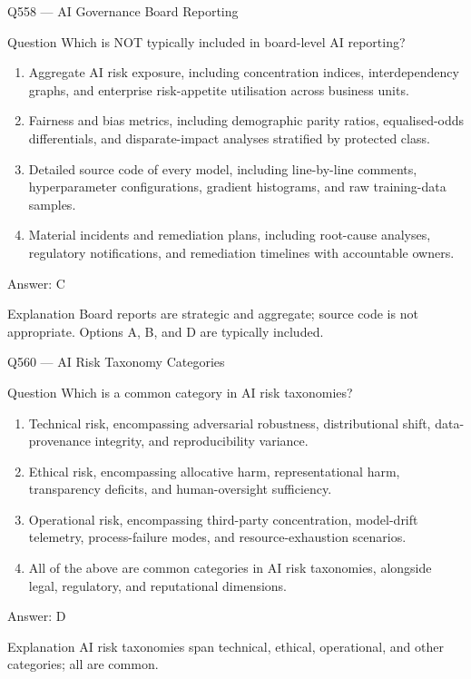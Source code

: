\documentclass[aspectratio=169,8pt]{beamer}
\begin{document}
	\begin{frame}{Q558 --- AI Governance Board Reporting}
		\begin{block}{Question}
			Which is NOT typically included in board-level AI reporting?
			\begin{enumerate}
				\item Aggregate AI risk exposure, including concentration indices, interdependency graphs, and enterprise risk-appetite utilisation across business units.
				\item Fairness and bias metrics, including demographic parity ratios, equalised-odds differentials, and disparate-impact analyses stratified by protected class.
				\item Detailed source code of every model, including line-by-line comments, hyperparameter configurations, gradient histograms, and raw training-data samples.
				\item Material incidents and remediation plans, including root-cause analyses, regulatory notifications, and remediation timelines with accountable owners.
			\end{enumerate}
		\end{block}
		\begin{exampleblock}{Answer: C}\end{exampleblock}
		\begin{block}{Explanation}
			Board reports are strategic and aggregate; source code is not appropriate. Options A, B, and D are typically included.
		\end{block}
	\end{frame}
	
	
	\begin{frame}{Q560 --- AI Risk Taxonomy Categories}
		\begin{block}{Question}
			Which is a common category in AI risk taxonomies?
			\begin{enumerate}
				\item Technical risk, encompassing adversarial robustness, distributional shift, data-provenance integrity, and reproducibility variance.
				\item Ethical risk, encompassing allocative harm, representational harm, transparency deficits, and human-oversight sufficiency.
				\item Operational risk, encompassing third-party concentration, model-drift telemetry, process-failure modes, and resource-exhaustion scenarios.
				\item All of the above are common categories in AI risk taxonomies, alongside legal, regulatory, and reputational dimensions.
			\end{enumerate}
		\end{block}
		\begin{exampleblock}{Answer: D}\end{exampleblock}
		\begin{block}{Explanation}
			AI risk taxonomies span technical, ethical, operational, and other categories; all are common.
		\end{block}
	\end{frame}
	
\end{document}
